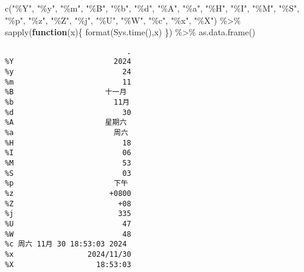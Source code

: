 \documentclass[
  letterpaper,
  DIV=11,
  numbers=noendperiod]{scrreprt}
\newenvironment{Shaded}{\begin{snugshade}}{\end{snugshade}}
\newcommand{\ControlFlowTok}[1]{\textcolor[rgb]{0.00,0.23,0.31}{\textbf{#1}}}
\newcommand{\FunctionTok}[1]{\textcolor[rgb]{0.28,0.35,0.67}{#1}}
\newcommand{\NormalTok}[1]{\textcolor[rgb]{0.00,0.23,0.31}{#1}}
\newcommand{\SpecialCharTok}[1]{\textcolor[rgb]{0.37,0.37,0.37}{#1}}
\newcommand{\StringTok}[1]{\textcolor[rgb]{0.13,0.47,0.30}{#1}}
\begin{document}
\begin{Shaded}
\begin{Highlighting}[]
\FunctionTok{c}\NormalTok{(}\StringTok{"\%Y"}\NormalTok{, }\StringTok{"\%y"}\NormalTok{, }\StringTok{"\%m"}\NormalTok{, }\StringTok{"\%B"}\NormalTok{, }\StringTok{"\%b"}\NormalTok{, }\StringTok{"\%d"}\NormalTok{, }\StringTok{"\%A"}\NormalTok{, }\StringTok{"\%a"}\NormalTok{, }\StringTok{"\%H"}\NormalTok{, }\StringTok{"\%I"}\NormalTok{, }\StringTok{"\%M"}\NormalTok{, }\StringTok{"\%S"}\NormalTok{, }\StringTok{"\%p"}\NormalTok{, }
  \StringTok{"\%z"}\NormalTok{, }\StringTok{"\%Z"}\NormalTok{, }\StringTok{"\%j"}\NormalTok{, }\StringTok{"\%U"}\NormalTok{, }\StringTok{"\%W"}\NormalTok{, }\StringTok{"\%c"}\NormalTok{, }\StringTok{"\%x"}\NormalTok{, }\StringTok{"\%X"}\NormalTok{) }\SpecialCharTok{\%\textgreater{}\%}
  \FunctionTok{sapply}\NormalTok{(}\ControlFlowTok{function}\NormalTok{(x)\{}
    \FunctionTok{format}\NormalTok{(}\FunctionTok{Sys.time}\NormalTok{(),x)}
\NormalTok{  \}) }\SpecialCharTok{\%\textgreater{}\%} \FunctionTok{as.data.frame}\NormalTok{()}
\end{Highlighting}
\end{Shaded}

\begin{verbatim}
                            .
%Y                       2024
%y                         24
%m                         11
%B                     十一月
%b                       11月
%d                         30
%A                     星期六
%a                       周六
%H                         18
%I                         06
%M                         53
%S                         03
%p                       下午
%z                      +0800
%Z                        +08
%j                        335
%U                         47
%W                         48
%c 周六 11月 30 18:53:03 2024
%x                 2024/11/30
%X                   18:53:03
\end{verbatim}
\end{document}
